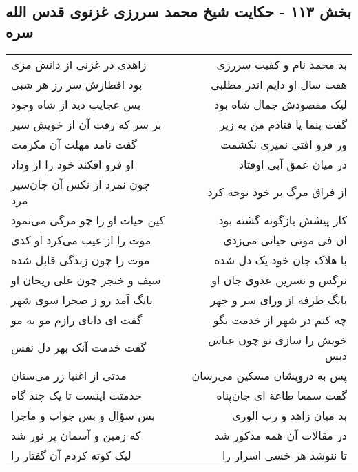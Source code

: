 \begin{center}
\section*{بخش ۱۱۳ - حکایت شیخ محمد سررزی غزنوی قدس الله سره}
\label{sec:sh113}
\begin{longtable}{l p{0.5cm} r}
زاهدی در غزنی از دانش مزی
&&
بد محمد نام و کفیت سررزی
\\
بود افطارش سر رز هر شبی
&&
هفت سال او دایم اندر مطلبی
\\
بس عجایب دید از شاه وجود
&&
لیک مقصودش جمال شاه بود
\\
بر سر که رفت آن از خویش سیر
&&
گفت بنما یا فتادم من به زیر
\\
گفت نامد مهلت آن مکرمت
&&
ور فرو افتی نمیری نکشمت
\\
او فرو افکند خود را از وداد
&&
در میان عمق آبی اوفتاد
\\
چون نمرد از نکس آن جان‌سیر مرد
&&
از فراق مرگ بر خود نوحه کرد
\\
کین حیات او را چو مرگی می‌نمود
&&
کار پیشش بازگونه گشته بود
\\
موت را از غیب می‌کرد او کدی
&&
ان فی موتی حیاتی می‌زدی
\\
موت را چون زندگی قابل شده
&&
با هلاک جان خود یک دل شده
\\
سیف و خنجر چون علی ریحان او
&&
نرگس و نسرین عدوی جان او
\\
بانگ آمد رو ز صحرا سوی شهر
&&
بانگ طرفه از ورای سر و جهر
\\
گفت ای دانای رازم مو به مو
&&
چه کنم در شهر از خدمت بگو
\\
گفت خدمت آنک بهر ذل نفس
&&
خویش را سازی تو چون عباس دبس
\\
مدتی از اغنیا زر می‌ستان
&&
پس به درویشان مسکین می‌رسان
\\
خدمتت اینست تا یک چند گاه
&&
گفت سمعا طاعة ای جان‌پناه
\\
بس سؤال و بس جواب و ماجرا
&&
بد میان زاهد و رب الوری
\\
که زمین و آسمان پر نور شد
&&
در مقالات آن همه مذکور شد
\\
لیک کوته کردم آن گفتار را
&&
تا ننوشد هر خسی اسرار را
\\
\end{longtable}
\end{center}
